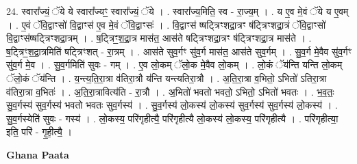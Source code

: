\documentclass[17pt]{extarticle}
\begin{document}
24. स्वारा᳚ज्यं॒ ॅये ये स्वारा᳚ज्यꣳ॒॒ स्वारा᳚ज्यं॒ ॅये । . स्वारा᳚ज्य॒मिति॒ स्व - रा॒ज्य॒म् । . य ए॒व मे॒वं ॅये य ए॒वम् । . ए॒वं ॅवि॒द्वाꣳसो॑ वि॒द्वाꣳस॑ ए॒व मे॒वं ॅवि॒द्वाꣳसः॑ । . वि॒द्वाꣳस॑ ष्षट्त्रिꣳशद्रा॒त्रꣳ ष॑ट्त्रिꣳशद्रा॒त्रं ॅवि॒द्वाꣳसो॑ वि॒द्वाꣳस॑ष्षट्त्रिꣳशद्रा॒त्रम् । . ष॒ट्त्रिꣳ॒॒श॒द्रा॒त्र मास॑त॒ आस॑ते षट्त्रिꣳशद्रा॒त्रꣳ ष॑ट्त्रिꣳशद्रा॒त्र मास॑ते । . ष॒ट्त्रिꣳ॒॒श॒द्रा॒त्रमिति॑ षट्त्रिꣳशत् - रा॒त्रम् । . आस॑ते सुव॒र्गꣳ सु॑व॒र्ग मास॑त॒ आस॑ते सुव॒र्गम् । . सु॒व॒र्ग मे॒वैव सु॑व॒र्गꣳ सु॑व॒र्ग मे॒व । . सु॒व॒र्गमिति॑ सुवः - गम् । . ए॒व लो॒कम् ॅलो॒क मे॒वैव लो॒कम् । . लो॒कं ॅय॑न्ति यन्ति लो॒कम् ॅलो॒कं ॅय॑न्ति । . य॒न्त्य॒ति॒रा॒त्रा व॑तिरा॒त्रौ य॑न्ति यन्त्यतिरा॒त्रौ । . अ॒ति॒रा॒त्रा व॒भितो॒ ऽभितो॑ ऽतिरा॒त्रा व॑तिरा॒त्रा व॒भितः॑ । . अ॒ति॒रा॒त्रावित्य॑ति - रा॒त्रौ । . अ॒भितो॑ भवतो भवतो॒ ऽभितो॒ ऽभितो॑ भवतः । . भ॒व॒तः॒ सु॒व॒र्गस्य॑ सुव॒र्गस्य॑ भवतो भवतः सुव॒र्गस्य॑ । . सु॒व॒र्गस्य॑ लो॒कस्य॑ लो॒कस्य॑ सुव॒र्गस्य॑ सुव॒र्गस्य॑ लो॒कस्य॑ । . सु॒व॒र्गस्येति॑ सुवः - गस्य॑ । . लो॒कस्य॒ परि॑गृहीत्यै॒ परि॑गृहीत्यै लो॒कस्य॑ लो॒कस्य॒ परि॑गृहीत्यै । . परि॑गृहीत्या॒ इति॒ परि॑ - गृ॒ही॒त्यै॒ । \newline

\textbf{Ghana Paata } \newline
\end{document}
